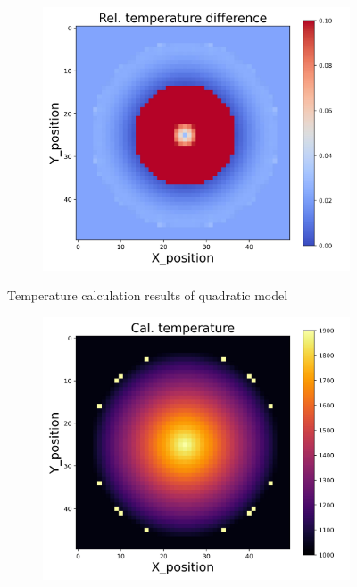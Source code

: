 {\begin{figure}[h]
\begin{minipage}{\textwidth}
\begin{subfigure}{0.27\textwidth}
        \end{subfigure}
        \begin{subfigure}{0.27\textwidth}
            \centering
            \includegraphics[width=\textwidth]{figures/raw_data/33/quad/T_bias.jpg}
        \end{subfigure}
    \end{minipage}
    \caption{Temperature calculation results of quadratic model}  
\end{figure}
\begin{figure}[p]
    \centering
    \begin{minipage}{\textwidth}
        \centering
        \begin{subfigure}{0.325\textwidth}
            \centering
            \includegraphics[width=\textwidth]{figures/raw_data/0/quad/T_cal.jpg}

\end{subfigure}
\end{minipage}
\end{figure}}
